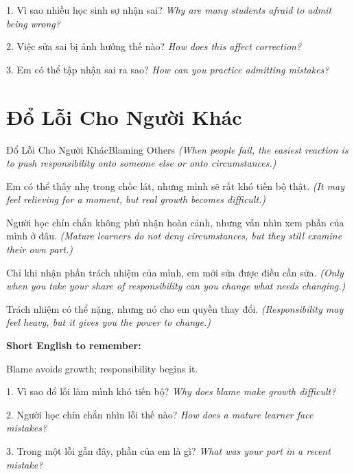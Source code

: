 \begin{tuhocnhanh}
1. Vì sao nhiều học sinh sợ nhận sai? \textit{Why are many students afraid to admit being wrong?}

2. Việc sửa sai bị ảnh hưởng thế nào? \textit{How does this affect correction?}

3. Em có thể tập nhận sai ra sao? \textit{How can you practice admitting mistakes?}
\end{tuhocnhanh}
\ngancach

\section{Đổ Lỗi Cho Người Khác}
\begin{truyen}{Đổ Lỗi Cho Người Khác}{Blaming Others}
\textit{(When people fail, the easiest reaction is to push responsibility onto someone else or onto circumstances.)}

Em có thể thấy nhẹ trong chốc lát, nhưng mình sẽ rất khó tiến bộ thật.
\textit{(It may feel relieving for a moment, but real growth becomes difficult.)}

Người học chín chắn không phủ nhận hoàn cảnh, nhưng vẫn nhìn xem phần của mình ở đâu.
\textit{(Mature learners do not deny circumstances, but they still examine their own part.)}

Chỉ khi nhận phần trách nhiệm của mình, em mới sửa được điều cần sửa.
\textit{(Only when you take your share of responsibility can you change what needs changing.)}
\end{truyen}

\begin{baihoc}
Trách nhiệm có thể nặng, nhưng nó cho em quyền thay đổi.
\textit{(Responsibility may feel heavy, but it gives you the power to change.)}
\end{baihoc}

\begin{ghinhoanh}
\textbf{Short English to remember:}

Blame avoids growth; responsibility begins it.

\end{ghinhoanh}

\begin{tuhocnhanh}
1. Vì sao đổ lỗi làm mình khó tiến bộ? \textit{Why does blame make growth difficult?}

2. Người học chín chắn nhìn lỗi thế nào? \textit{How does a mature learner face mistakes?}

3. Trong một lỗi gần đây, phần của em là gì? \textit{What was your part in a recent mistake?}
\end{tuhocnhanh}
\ngancach


